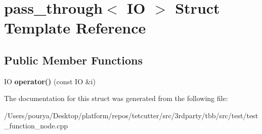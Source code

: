 \hypertarget{structpass__through}{}\section{pass\+\_\+through$<$ I\+O $>$ Struct Template Reference}
\label{structpass__through}
\subsection*{Public Member Functions}
\begin{DoxyCompactItemize}
\item 
\hypertarget{structpass__through_af1a9ab49739a0021019c77ea2879f28d}{}I\+O {\bfseries operator()} (const I\+O \&i)\label{structpass__through_af1a9ab49739a0021019c77ea2879f28d}

\end{DoxyCompactItemize}


The documentation for this struct was generated from the following file\+:\begin{DoxyCompactItemize}
\item 
/\+Users/pourya/\+Desktop/platform/repos/tetcutter/src/3rdparty/tbb/src/test/test\+\_\+function\+\_\+node.\+cpp\end{DoxyCompactItemize}
